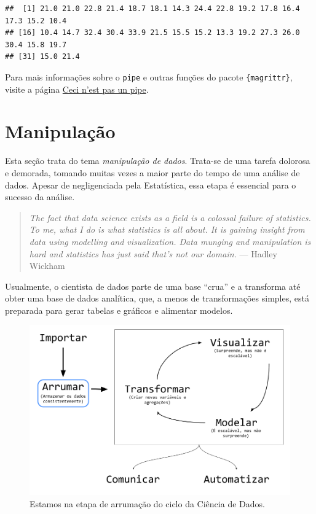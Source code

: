 \documentclass[
]{book}
\begin{document}
\begin{verbatim}
##  [1] 21.0 21.0 22.8 21.4 18.7 18.1 14.3 24.4 22.8 19.2 17.8 16.4 17.3 15.2 10.4
## [16] 10.4 14.7 32.4 30.4 33.9 21.5 15.5 15.2 13.3 19.2 27.3 26.0 30.4 15.8 19.7
## [31] 15.0 21.4
\end{verbatim}

Para mais informações sobre o \texttt{pipe} e outras funções do pacote \texttt{\{magrittr\}}, visite a página \href{http://cran.r-project.org/web/packages/magrittr/vignettes/magrittr.html}{Ceci n'est pas un pipe}.

\hypertarget{manipulacao}{%
\chapter{Manipulação}\label{manipulacao}}

Esta seção trata do tema \emph{manipulação de dados}. Trata-se de uma tarefa dolorosa e demorada, tomando muitas vezes a maior parte do tempo de uma análise de dados. Apesar de negligenciada pela Estatística, essa etapa é essencial para o sucesso da análise.

\begin{quote}
\emph{The fact that data science exists as a field is a colossal failure of statistics. To me, what I do is what statistics is all about. It is gaining insight from data using modelling and visualization. Data munging and manipulation is hard and statistics has just said that's not our domain.} --- Hadley Wickham
\end{quote}

Usualmente, o cientista de dados parte de uma base ``crua'' e a transforma até obter uma base de dados analítica, que, a menos de transformações simples, está preparada para gerar tabelas e gráficos e alimentar modelos.

\begin{figure}

{\centering \includegraphics[width=13.31in]{assets/img/manipulacao/ciclo-ciencia-de-dados} 

}

\caption{Estamos na etapa de arrumação do ciclo da Ciência de Dados.}\label{fig:transform}
\end{figure}
\end{document}
